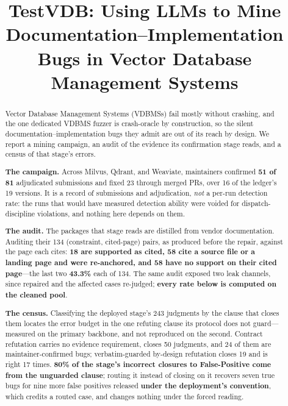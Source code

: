 \documentclass[acmsmall,screen,review,anonymous]{acmart}
\begin{document}
\title[TestVDB: Mining Documentation--Implementation Bugs in Vector Databases]{TestVDB:
Using LLMs to Mine Documentation--Implementation Bugs in Vector Database Management Systems}

\begin{abstract}
Vector Database Management Systems (VDBMSs) fail mostly without crashing, and the one dedicated
VDBMS fuzzer is crash-oracle by construction, so the silent documentation--implementation bugs they
admit are out of its reach by design. We report a mining campaign, an audit of the evidence its
confirmation stage reads, and a census of that stage's errors.

\textbf{The campaign.} Across Milvus, Qdrant, and Weaviate, maintainers confirmed \textbf{51 of 81}
adjudicated submissions and fixed 23 through merged PRs, over 16 of the ledger's 19 versions. It is a
record of submissions and adjudication, \emph{not} a per-run detection rate: the runs that would have
measured detection ability were voided for dispatch-discipline violations, and nothing here depends on
them.

\textbf{The audit.} The packages that stage reads are distilled from vendor documentation. Auditing
their 134 (constraint, cited-page) pairs, as produced before the repair, against the page each cites:
\textbf{18 are supported as cited, 58 cite a source file or a landing page and
were re-anchored, and 58 have no support on their cited page}---the last two \textbf{43.3\%} each of
134. The same audit exposed two
leak channels, since repaired and the affected cases re-judged; \textbf{every rate below is computed
on the cleaned pool}.

\textbf{The census.} Classifying the deployed stage's 243 judgments by the clause that closes them
locates the error budget in the one refuting clause its protocol does not guard---measured on the
primary backbone, and not reproduced on the second. Contract refutation carries no evidence
requirement, closes 50 judgments, and 24 of them are maintainer-confirmed bugs; verbatim-guarded
by-design refutation closes 19 and is right 17 times. \textbf{80\% of the stage's incorrect closures
to False-Positive come from the unguarded clause}; routing it instead of closing on it recovers seven
true bugs for nine more false positives released \textbf{under the deployment's convention}, which
credits a routed case, and changes nothing under the forced reading.
\end{abstract}

\maketitle
\end{document}
